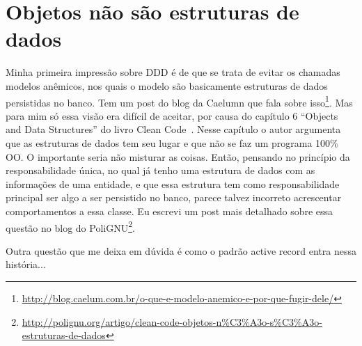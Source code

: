\documentclass[a4paper, 12pt]{article}
\begin{document}
\section{Objetos não são estruturas de dados}

Minha primeira impressão sobre DDD é de que se trata de evitar os chamadas modelos anêmicos, nos quais o modelo são basicamente estruturas de dados persistidas no banco. Tem um post do blog da Caelumn que fala sobre isso\footnote{\url{http://blog.caelum.com.br/o-que-e-modelo-anemico-e-por-que-fugir-dele/}}. Mas para mim só essa visão era difícil de aceitar, por causa do capítulo 6 ``Objects and Data Structures'' do livro Clean Code~\cite{Bob2008Clean}. Nesse capítulo o autor argumenta que as estruturas de dados tem seu lugar e que não se faz um programa 100\% OO. O importante seria não misturar as coisas. Então, pensando no princípio da responsabilidade única, no qual já tenho uma estrutura de dados com as informações de uma entidade, e que essa estrutura tem como responsabilidade principal ser algo a ser persistido no banco, parece talvez incorreto acrescentar comportamentos a essa classe. Eu escrevi um post mais detalhado sobre essa questão no blog do PoliGNU\footnote{\url{http://polignu.org/artigo/clean-code-objetos-n\%C3\%A3o-s\%C3\%A3o-estruturas-de-dados}}.

Outra questão que me deixa em dúvida é como o padrão active record entra nessa história...



  
\end{document}
